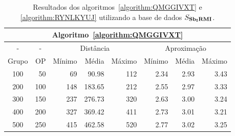 \begin{table}[!htb]
  \caption{Resultados dos algoritmos~\ref{algorithm:QMGGIVXT} e \ref{algorithm:RYNLKYUJ} utilizando a base de dados $S_{\textbf{Sb\textsubscript{I}RMI}}{}$.}
  \label{table:GITKWJXD}
  \centering
  \begin{tabular}{|c|r|r|r|r|r|r|r|}
    \hline
    \multicolumn{8}{|c|}{Algoritmo~\ref{algorithm:QMGGIVXT}}                                                                    \\ \hline
      -      & \multicolumn{1}{c|}{-} & \multicolumn{3}{c|}{Distância}             & \multicolumn{3}{c|}{Aproximação}           \\ \hline
    Grupo    & OP                     & Mínimo       & Média        & Máximo       & Mínimo       & Média        & Máximo       \\ \hline  
    100      & 50                     & 69           &  90.98       & 112          & 2.34         & 2.93         & 3.43         \\ \hline
    200      & 100                    & 148          & 183.65       & 212          & 2.55         & 2.97         & 3.33         \\ \hline
    300      & 150                    & 237          & 276.73       & 320          & 2.63         & 3.00         & 3.24         \\ \hline
    400      & 200                    & 327          & 369.42       & 411          & 2.73         & 3.01         & 3.21         \\ \hline
    500      & 250                    & 415          & 462.58       & 520          & 2.77         & 3.02         & 3.25         \\ \hline    
  \end{tabular}

  \vspace{5mm}


\end{table}
